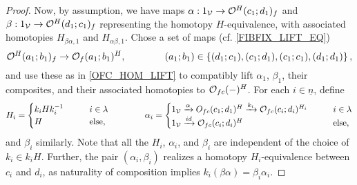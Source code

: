 \documentclass[a4paper,10pt
,draft
]{article}%
\renewcommand{\1}{\eta}%
\begin{document}
\begin{proof}
      Now, by assumption, we have maps
      $\alpha: 1_{\mathcal V} \to \mathcal{O}^H(c_1;d_1)_f$ and $\beta: 1_{\mathcal V} \to \mathcal{O}^H(d_1;c_1)_f$
      representing the homotopy $H$-equivalence,
      with associated homotopies $H_{\beta\alpha,1}$ and $H_{\alpha\beta,1}$.
      Chose a set of maps (cf. \eqref{FIBFIX_LIFT_EQ})
      \begin{equation}
            \mathcal{O}^H(a_1;b_1)_f \to \mathcal{O}_f(a_1;b_1)^H,
            \qquad \qquad
            (a_1;b_1) \in  \left\{(d_1;c_1), (c_1;d_1), (c_1;c_1), (d_1;d_1)\right\},
      \end{equation}
      and use these as in \eqref{OFC_HOM_LIFT} to compatibly lift
      $\alpha_1$, $\beta_1$, their composites, and their associated homotopies to $\mathcal{O}_{f c}(-)^H$.
      For each $i \in \underline{n}$, define
      \begin{equation}
            \label{WEAKEQCOLORS_EQ}
            H_i =
            \begin{cases}
                  k_i H k_i^{-1} \qquad & i \in \lambda
                  \\
                  H & \mbox{else,}
            \end{cases}
            \qquad
            \qquad 
            \alpha_i =
            \begin{cases}
                  1_{\mathcal V} \xrightarrow{\alpha} O_{f c}(c_1;d_1)^H \xrightarrow{k_i} \mathcal{O}_{f c}(c_i;d_i)^{H_i} \qquad & i \in \lambda
                  \\
                  1_{\mathcal V} \xrightarrow{id} \mathcal{O}_{f c}(c_i;d_i)^H & \mbox{else},
            \end{cases}
      \end{equation}
      and $\beta_i$ similarly.
      Note that all the $H_i$, $\alpha_i$, and $\beta_i$ are independent of the choice of $k_i\in k_i H$.
      Further, 
      the pair $(\alpha_i,\beta_i)$ realizes a homotopy $H_i$-equivalence between $c_i$ and $d_i$,
      as naturality of composition implies
      $k_i (\beta\alpha) = \beta_i\alpha_i$.
      

\end{proof}
\end{document}
